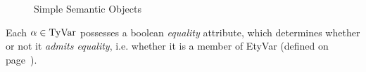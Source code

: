 \begin{figure}[h]
\vspace{2pt}
\caption{Simple Semantic Objects}
\label{simple-objects}
\end{figure}

Each $\alpha \in{\rm TyVar}$ possesses a boolean {\sl equality} attribute,
which determines whether or not it {\sl admits equality}, i.e. whether
it is a member of EtyVar (defined on page~\pageref{etyvar-lab}).

